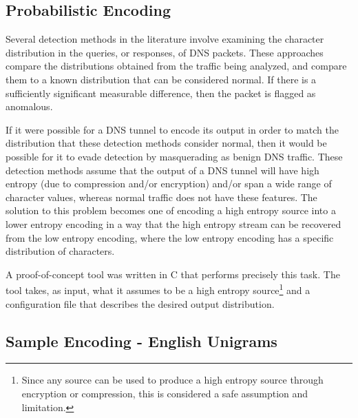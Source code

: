 \documentclass[12pt]{report}
\theoremstyle{remark}
\theoremstyle{definition}
\theoremstyle{definition}
\theoremstyle{definition}
\begin{document}
\begin{appendices}


\chapter{Probabilistic Encoding}
\label{appendix-probcode}
Several detection methods in
the literature involve examining the character distribution in the queries, or
responses, of DNS packets. These approaches compare the distributions obtained
from the traffic being analyzed, and compare them to a known distribution that
can be considered normal. If there is a sufficiently significant measurable
difference, then the packet is flagged as anomalous.

If it were possible for a DNS tunnel to encode its output in order to match the
distribution that these detection methods consider normal, then it would be
possible for it to evade detection by masquerading as benign DNS traffic. These
detection methods assume that the output of a DNS tunnel will have high entropy
(due to compression and/or encryption) and/or span a wide range of character
values, whereas normal traffic does not have these features. The solution to
this problem becomes one of encoding a high entropy source into a lower entropy
encoding in a way that the high entropy stream can be recovered from the low
entropy encoding, where the low entropy encoding has a specific distribution of
characters.

A proof-of-concept tool was written in C that performs precisely this task. The
tool takes, as input, what it assumes to be a high entropy source\footnote{Since
any source can be used to produce a high entropy source through encryption or
compression, this is considered a safe assumption and limitation.} and a
configuration file that describes the desired output distribution.

\section{Sample Encoding - English Unigrams}


\end{appendices}
\end{document}
